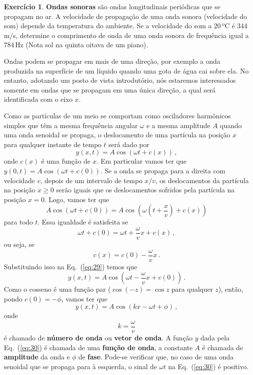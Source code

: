 \documentclass[twocolumn=on,fontsize=12pt,DIV=calc]{scrartcl}
\newcommand{\dpar}[1]{\left(#1\right)}
\theoremstyle{definition}
\newtheorem{ex}{Exercício}[section]
\begin{document}
\begin{ex}
  \textbf{Ondas sonoras} são ondas longitudinais periódicas que se
  propagam no ar. A velocidade de propagação de uma onda sonora
  (velocidade do som) depende da temperatura do ambiente. Se a
  velocidade do som a $20\,º\mathrm{C}$ é 344\,\textrm{m/s}, determine
  o comprimento de onda de uma onda sonora de frequência igual a
  $784\,\mathrm{Hz}$ (Nota sol na quinta oitava de um piano).
\end{ex}

Ondas podem se propagar em mais de uma direção, por exemplo a onda
produzida na superfície de um líquido quando uma gota de água cai
sobre ela. No entanto, adotando um posto de vista introdutório, nós
estaremos interessados somente em ondas que se propagam em uma única
direção, a qual será identificada com o eixo $x$.

Como as partículas de um meio se comportam como osciladores harmônicos
simples que têm a mesma frequência angular $\omega$ e a mesma
amplitude $A$ quando uma onda senoidal se propaga, o deslocamento de
uma partícula na posição $x$ para qualquer instante de tempo $t$ será
dado por
\begin{equation}
  \label{eq:29}
  y(x,t)=A\cos(\omega t+c(x))\,,
\end{equation}
onde $c(x)$ é uma função de $x$. Em particular vamos ter que
$y(0,t)=A\cos(\omega t+c(0))$. Se a onda se propaga para a direita com
velocidade $v$, depois de um intervalo de tempo $x/v$, os
deslocamentos da partícula na posição $x\ge 0$ serão iguais que os
deslocamentos sofridos pela partícula na posição $x=0$. Logo, vamos
ter que
$$A\cos(\omega t+c(0))=A\cos\dpar{\omega\dpar{t+\frac{x}{v}}+c(x)}$$
para todo $t$. Essa igualdade é satisfeita se
$$\omega t+c(0)=\omega t+\frac{\omega}{v} x+c(x)\,,$$
ou seja, se
$$c(x)=c(0)-\frac{\omega}{v} x\,.$$
Substituindo isso na Eq.~(\ref{eq:29}) temos que
$$y(x,t)=A\cos\dpar{\omega t-\frac{\omega}{v} x+c(0)}\,.$$
Como o cosseno é uma função par ($\cos (-z)=\cos z$ para qualquer
$z$), então, pondo $c(0)=-\phi$, vamos ter que
\begin{equation}
  \label{eq:30}
  y(x,t)=A\cos(kx-\omega t+\phi)\,,
\end{equation}
onde
$$k=\frac{\omega}{v}$$
é chamado de \textbf{número de onda} ou \textbf{vetor de onda}. A
função $y$ dada pela Eq.~(\ref{eq:30}) é chamada de uma \textbf{função
  de onda}, a constante $A$ é chamada de \textbf{amplitude} da onda e
$\phi$ de \textbf{fase}. Pode-se verificar que, no caso de uma onda
senoidal que se propaga para à esquerda, o sinal de $\omega t$ na
Eq.~(\ref{eq:30}) é positivo.
\end{document}
